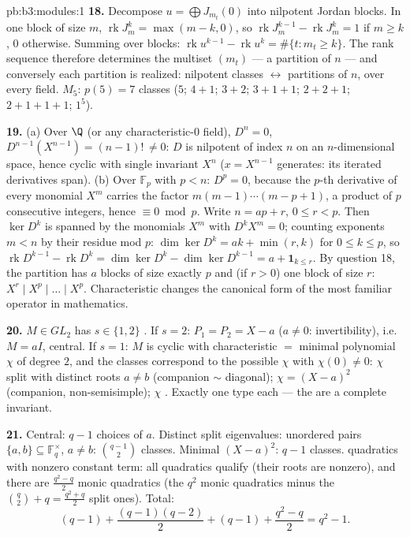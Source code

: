 \begin{solution}{pb:b3:modules:1}
\textbf{18.} Decompose $u = \bigoplus J_{m_t}(0)$ into
nilpotent Jordan blocks. In one block of size $m$,
$\operatorname{rk}J_m^k = \max(m - k, 0)$, so
$\operatorname{rk}J_m^{k-1} - \operatorname{rk}J_m^k = 1$ if $m
\geq k$, $0$ otherwise. Summing over blocks:
$\operatorname{rk}u^{k-1} - \operatorname{rk}u^k =
\#\{t : m_t \geq k\}$. The rank sequence therefore determines
the multiset $(m_t)$ --- a partition of $n$ --- and conversely
each partition is realized: nilpotent classes $\leftrightarrow$
partitions of $n$, over every field. $M_5$: $p(5) = 7$ classes
($5$; $4{+}1$; $3{+}2$; $3{+}1{+}1$; $2{+}2{+}1$;
$2{+}1{+}1{+}1$; $1^5$).

\textbf{19.} (a) Over $\Q$ (or any characteristic-$0$ field),
$D^n = 0$, $D^{n-1}(X^{n-1}) = (n-1)!\, \neq 0$: $D$ is
nilpotent of index $n$ on an $n$-dimensional space, hence
cyclic with single invariant $X^n$ ($x = X^{n-1}$ generates:
its iterated derivatives span). (b) Over $\mathbb F_p$ with $p
< n$: $D^p = 0$, because the $p$-th derivative of every
monomial $X^m$ carries the factor $m(m-1)\cdots(m-p+1)$, a
product of $p$ consecutive integers, hence $\equiv 0 \bmod p$.
Write $n = ap + r$, $0 \leq r < p$. Then $\ker D^k$ is spanned
by the monomials $X^m$ with $D^kX^m = 0$; counting exponents
$m < n$ by their residue mod $p$: $\dim\ker D^k = ak + \min(r,
k)$ for $0 \leq k \leq p$, so $\operatorname{rk}D^{k-1} -
\operatorname{rk}D^k = \dim\ker D^k - \dim\ker D^{k-1} = a +
\mathbf 1_{k \leq r}$. By question 18, the partition has $a$
blocks of size exactly $p$ and (if $r > 0$) one block of size
$r$:  $X^r \mid X^p \mid \dots \mid X^p$.
Characteristic changes the canonical form of the most familiar
operator in mathematics.

\textbf{20.} $M \in GL_2$ has $s \in \{1, 2\}$ . If $s = 2$: $P_1 = P_2 = X - a$ ($a \neq 0$:
invertibility), i.e.\ $M = aI$, central. If $s = 1$: $M$ is
cyclic with characteristic $=$ minimal polynomial $\chi$ of
degree $2$, and the classes correspond to the possible $\chi$
with $\chi(0) \neq 0$: $\chi$ split with distinct roots $a \neq
b$ (companion $\sim$ diagonal); $\chi = (X - a)^2$ (companion,
non-semisimple); $\chi$ . Exactly one type each ---
the  are a complete invariant.

\textbf{21.} Central: $q - 1$ choices of $a$. Distinct split
eigenvalues: unordered pairs $\{a, b\} \subseteq
\mathbb F_q^\times$, $a \neq b$: $\binom{q-1}2$ classes.
Minimal $(X-a)^2$: $q - 1$ classes.  quadratics with
nonzero constant term: all  quadratics qualify
(their roots are nonzero), and there are $\frac{q^2 - q}2$
monic  quadratics (the $q^2$ monic quadratics minus
the $\binom q2 + q = \frac{q^2+q}2$ split ones). Total:
\[
(q - 1) + \frac{(q-1)(q-2)}2 + (q - 1) + \frac{q^2 - q}2
= q^2 - 1 .
\]


\end{solution}
